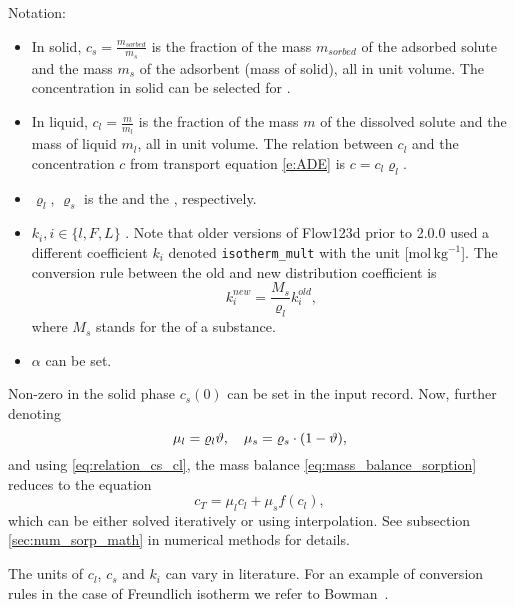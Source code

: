 Notation:
\begin{itemize}
 \item In solid, $c_s = \frac{m_{sorbed}}{m_s}$ \units{}{}{} is the fraction of the mass $m_{sorbed}$ of the adsorbed solute 
       and the mass $m_s$ of the adsorbent (mass of solid), all in unit volume. The concentration
       in solid can be selected for .
 \item In liquid, $c_l = \frac{m}{m_l}$ \units{}{}{} is the fraction of the mass $m$ of the dissolved solute and 
       the mass of liquid $m_l$, all in unit volume. The relation between $c_l$ and the concentration $c$ from 
       transport equation \eqref{e:ADE} is $c = c_l \varrho_l$.
 \item $\varrho_l$, $\varrho_s$ is the  and 
       the , respectively.
\item {} $k_i, i\in\{ l,F,L\}$ .
Note that older versions of Flow123d prior to 2.0.0 used a different coefficient $k_i$ denoted \texttt{isotherm\_mult} with the unit [mol$\,\mathrm{kg}^{-1}$].
The conversion rule between the old and new distribution coefficient is
\[ k_i^{new} = \frac{M_s}{\varrho_l} k_i^{old}, \]
where $M_s$ stands for the  of a substance.
\item {} $\alpha$ \units{}{}{} can be set.
\end{itemize}

Non-zero  in the solid phase $c_s(0)$ can be set in the input record. 
Now, further denoting \[ \mu_l = \varrho_l \vartheta, \quad \mu_s = \varrho_s\cdot(1-\vartheta), \]
and using \eqref{eq:relation_cs_cl}, the mass balance \eqref{eq:mass_balance_sorption} reduces to the equation
\begin{equation}
 c_T = \mu_l c_l + \mu_s f(c_l),
 \label{eq:nonlin_sorption}
\end{equation}
which can be either solved iteratively or using interpolation. See subsection \ref{sec:num_sorp_math} 
in numerical methods for details.

The units of $c_l$, $c_s$ and $k_i$ can vary in literature. For an example of conversion rules in the case of Freundlich isotherm we refer to Bowman~\cite{bowman_conversion_1982}.

